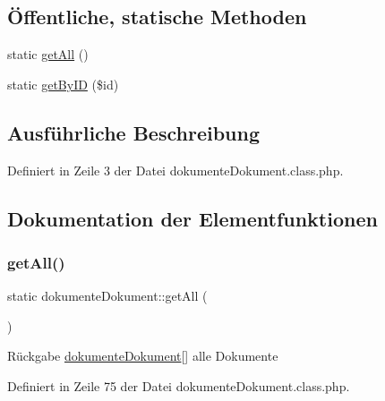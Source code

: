 \subsection*{Öffentliche, statische Methoden}
\begin{DoxyCompactItemize}
\item 
static \mbox{\hyperlink{classdokumente_dokument_a35dc17b286a52a2d9b26c939dfbed5ce}{get\+All}} ()
\item 
static \mbox{\hyperlink{classdokumente_dokument_a2e9b5046210021687b9a182ec6a842cc}{get\+By\+ID}} (\$id)
\end{DoxyCompactItemize}


\subsection{Ausführliche Beschreibung}


Definiert in Zeile 3 der Datei dokumente\+Dokument.\+class.\+php.



\subsection{Dokumentation der Elementfunktionen}
\mbox{\label{classdokumente_dokument_a35dc17b286a52a2d9b26c939dfbed5ce}} 
\subsubsection{\texorpdfstring{get\+All()}{getAll()}}
{\footnotesize\ttfamily static dokumente\+Dokument\+::get\+All (\begin{DoxyParamCaption}{ }\end{DoxyParamCaption})\hspace{0.3cm}{\ttfamily [static]}}

\begin{DoxyReturn}{Rückgabe}
\mbox{\hyperlink{classdokumente_dokument}{dokumente\+Dokument}}\mbox{[}\mbox{]} alle Dokumente 
\end{DoxyReturn}


Definiert in Zeile 75 der Datei dokumente\+Dokument.\+class.\+php.

\mbox{\label{classdokumente_dokument_a2e9b5046210021687b9a182ec6a842cc}} 
